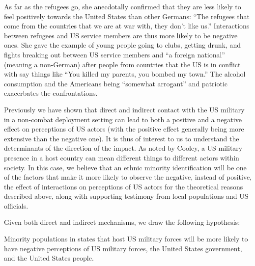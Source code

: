 As far as the refugees go, she anecdotally confirmed that they are less likely to feel positively towards the United States than other Germans: ``The refugees that come from the countries that we are at war with, they don't like us.'' Interactions between refugees and US service members are thus more likely to be negative ones. She gave the example of young people going to clubs, getting drunk, and fights breaking out between US service members and ``a foreign national'' (meaning a non-German) after people from countries that the US is in conflict with say things like ``You killed my parents, you bombed my town.'' The alcohol consumption and the Americans being ``somewhat arrogant'' and patriotic exacerbates the confrontations. 

Previously we have shown that direct and indirect contact with the US military in a non-combat deployment setting can lead to both a positive and a negative effect on perceptions of US actors (with the positive effect generally being more extensive than the negative one).  It is thus of interest to us to understand the determinants of the direction of the impact. As noted by Cooley, a US military presence in a host country can mean different things to different actors within society.\cite{Cooley2008} In this case, we believe that an ethnic minority identification will be one of the factors that make it more likely to observe the negative, instead of positive, the effect of interactions on perceptions of US actors for the theoretical reasons described above, along with supporting testimony from local populations and US officials. 

Given both direct and indirect mechanisms, we draw the following hypothesis:

\begin{hyp}
	Minority populations in states that host US military forces will be more likely to have negative perceptions of US military forces, the United States government, and the United States people. 
\end{hyp}



